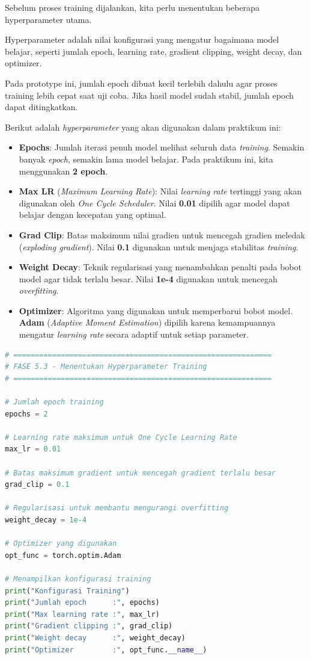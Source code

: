 Sebelum proses training dijalankan, kita perlu menentukan beberapa hyperparameter utama.

Hyperparameter adalah nilai konfigurasi yang mengatur bagaimana model belajar, seperti jumlah epoch, learning rate, gradient clipping, weight decay, dan optimizer.

Pada prototype ini, jumlah epoch dibuat kecil terlebih dahulu agar proses training lebih cepat saat uji coba. Jika hasil model sudah stabil, jumlah epoch dapat ditingkatkan.

Berikut adalah \textit{hyperparameter} yang akan digunakan dalam praktikum ini:

\begin{itemize}
    \item \textbf{Epochs}: Jumlah iterasi penuh model melihat seluruh data \textit{training}. Semakin banyak \textit{epoch}, semakin lama model belajar. Pada praktikum ini, kita menggunakan \textbf{2 epoch}.
    \item \textbf{Max LR} (\textit{Maximum Learning Rate}): Nilai \textit{learning rate} tertinggi yang akan digunakan oleh \textit{One Cycle Scheduler}. Nilai \textbf{0.01} dipilih agar model dapat belajar dengan kecepatan yang optimal.
    \item \textbf{Grad Clip}: Batas maksimum nilai gradien untuk mencegah gradien meledak (\textit{exploding gradient}). Nilai \textbf{0.1} digunakan untuk menjaga stabilitas \textit{training}.
    \item \textbf{Weight Decay}: Teknik regularisasi yang menambahkan penalti pada bobot model agar tidak terlalu besar. Nilai \textbf{1e-4} digunakan untuk mencegah \textit{overfitting}.
    \item \textbf{Optimizer}: Algoritma yang digunakan untuk memperbarui bobot model. \textbf{Adam} (\textit{Adaptive Moment Estimation}) dipilih karena kemampuannya mengatur \textit{learning rate} secara adaptif untuk setiap parameter.
\end{itemize}

\begin{lstlisting}[language=Python, caption=Menentukan hyperparameter training]
# ============================================================
# FASE 5.3 - Menentukan Hyperparameter Training
# ============================================================

# Jumlah epoch training
epochs = 2

# Learning rate maksimum untuk One Cycle Learning Rate
max_lr = 0.01

# Batas maksimum gradient untuk mencegah gradient terlalu besar
grad_clip = 0.1

# Regularisasi untuk membantu mengurangi overfitting
weight_decay = 1e-4

# Optimizer yang digunakan
opt_func = torch.optim.Adam

# Menampilkan konfigurasi training
print("Konfigurasi Training")
print("Jumlah epoch      :", epochs)
print("Max learning rate :", max_lr)
print("Gradient clipping :", grad_clip)
print("Weight decay      :", weight_decay)
print("Optimizer         :", opt_func.__name__)
\end{lstlisting}

